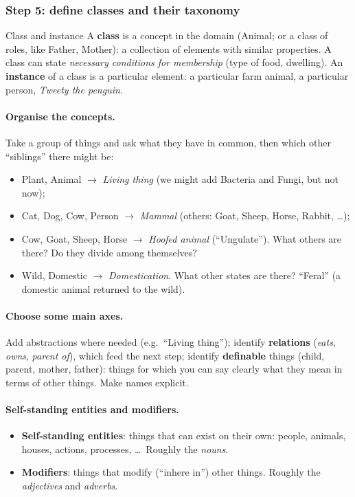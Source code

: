 \subsubsection{Step 5: define classes and their taxonomy}

\begin{nbdef}{Class and instance}
A \textbf{class} is a concept in the domain (Animal; or a class of roles, like Father,
Mother): a collection of elements with similar properties. A class can state
\emph{necessary conditions for membership} (type of food, dwelling). An
\textbf{instance} of a class is a particular element: a particular farm animal, a
particular person, \emph{Tweety the penguin}.
\end{nbdef}

\paragraph{Organise the concepts.}
Take a group of things and ask what they have in common, then which other ``siblings''
there might be:
\begin{itemize}[nosep]
  \item Plant, Animal $\to$ \emph{Living thing} (we might add Bacteria and Fungi, but not
        now);
  \item Cat, Dog, Cow, Person $\to$ \emph{Mammal} (others: Goat, Sheep, Horse, Rabbit,
        \ldots);
  \item Cow, Goat, Sheep, Horse $\to$ \emph{Hoofed animal} (``Ungulate''). What others
        are there? Do they divide among themselves?
  \item Wild, Domestic $\to$ \emph{Domestication}. What other states are there?
        ``Feral'' (a domestic animal returned to the wild).
\end{itemize}

\paragraph{Choose some main axes.}
Add abstractions where needed (e.g.\ ``Living thing''); identify \textbf{relations}
(\emph{eats}, \emph{owns}, \emph{parent of}), which feed the next step; identify
\textbf{definable} things (child, parent, mother, father): things for which you can say
clearly what they mean in terms of other things. Make names explicit.

\paragraph{Self-standing entities and modifiers.}
\begin{itemize}[nosep]
  \item \textbf{Self-standing entities}: things that can exist on their own: people,
        animals, houses, actions, processes, \ldots\ Roughly the \emph{nouns}.
  \item \textbf{Modifiers}: things that modify (``inhere in'') other things. Roughly the
        \emph{adjectives} and \emph{adverbs}.
\end{itemize}

